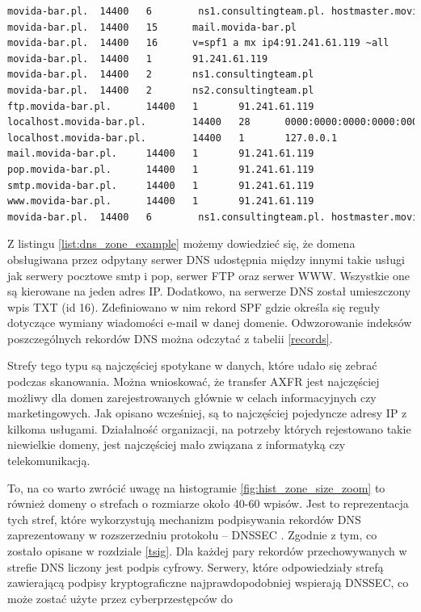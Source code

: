 \begin{lstlisting}[label={list:dns_zone_example},captionpos=b,caption=Przykładowa odpowiedź na żądanie strefy DNS.,language=bash]
movida-bar.pl.  14400   6        ns1.consultingteam.pl. hostmaster.movida-bar.pl. 1952801133 3222735464 1869837421 1634956389 1925188727
movida-bar.pl.  14400   15      mail.movida-bar.pl
movida-bar.pl.  14400   16      v=spf1 a mx ip4:91.241.61.119 ~all
movida-bar.pl.  14400   1       91.241.61.119
movida-bar.pl.  14400   2       ns1.consultingteam.pl
movida-bar.pl.  14400   2       ns2.consultingteam.pl
ftp.movida-bar.pl.      14400   1       91.241.61.119
localhost.movida-bar.pl.        14400   28      0000:0000:0000:0000:0000:0000:0000:0001
localhost.movida-bar.pl.        14400   1       127.0.0.1
mail.movida-bar.pl.     14400   1       91.241.61.119
pop.movida-bar.pl.      14400   1       91.241.61.119
smtp.movida-bar.pl.     14400   1       91.241.61.119
www.movida-bar.pl.      14400   1       91.241.61.119
movida-bar.pl.  14400   6        ns1.consultingteam.pl. hostmaster.movida-bar.pl. 2013010900 14400 3600 1209600 86400
\end{lstlisting}

Z listingu \ref{list:dns_zone_example} możemy dowiedzieć się, że domena obsługiwana przez odpytany serwer DNS udostępnia między
innymi takie usługi jak serwery pocztowe smtp i pop, serwer FTP oraz serwer WWW. Wszystkie one są kierowane na jeden adres IP.
Dodatkowo, na serwerze DNS został umieszczony wpis TXT (id 16). Zdefiniowano w nim rekord SPF gdzie określa się reguły dotyczące
wymiany wiadomości e-mail w danej domenie. Odwzorowanie indeksów poszczególnych rekordów DNS można odczytać z tabelii \ref{records}.

Strefy tego typu są najczęściej spotykane w danych, które udało się zebrać podczas skanowania. Można wnioskować, że transfer AXFR
jest najczęściej możliwy dla domen zarejestrowanych głównie w celach informacyjnych czy marketingowych. Jak opisano wcześniej, są
to najczęściej pojedyncze adresy IP z kilkoma usługami. Działalność organizacji, na potrzeby których rejestowano takie niewielkie
domeny, jest najczęściej mało związana z informatyką czy telekomunikacją.

To, na co warto zwrócić uwagę na histogramie \ref{fig:hist_zone_size_zoom} to również domeny o strefach o rozmiarze około 40-60 wpisów.
Jest to reprezentacja tych stref, które wykorzystują mechanizm podpisywania rekordów DNS zaprezentowany w rozszerzedniu
protokołu -- DNSSEC \cite{RFC4034, RFC4035}. Zgodnie z tym, co zostało opisane w rozdziale \ref{tsig}. Dla każdej pary rekordów
przechowywanych w strefie DNS liczony jest podpis cyfrowy. Serwery, które odpowiedziały strefą zawierającą podpisy kryptograficzne
najprawdopodobniej wspierają DNSSEC, co może zostać użyte przez cyberprzestępców do

